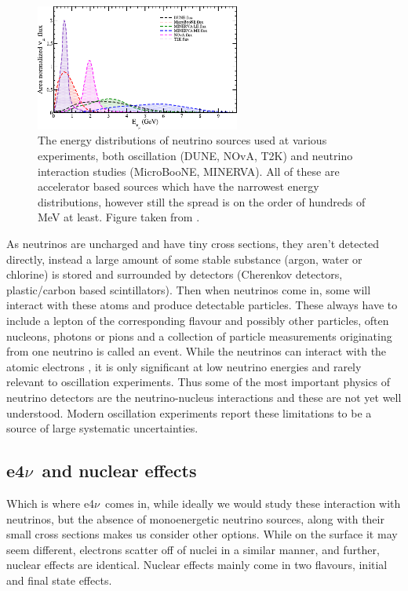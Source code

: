 \documentclass[a4paper,12pt]{article}
\newcommand{\efn}{e4$\nu$}
\begin{document}
\begin{figure}[H]
    \centering
    \includegraphics[width=0.6\textwidth]{figures/sourceEnergies.pdf}
    \caption{
        The energy distributions of neutrino sources used at various experiments, both oscillation (DUNE, NOvA, T2K) and neutrino interaction studies (MicroBooNE\cite{acciarriDesignConstructionMicroBooNE2017}, MINERVA\cite{mcfarlandMINERnADedicatedNeutrino2006}).
        All of these are accelerator based sources which have the narrowest energy distributions, however still the spread is on the order of hundreds of \si{MeV} at least.
        Figure taken from \cite{sajjadatharNeutrinosTheirInteractions2023}.
    }\label{fig:neu_s_Es}
\end{figure}

As neutrinos are uncharged and have tiny cross sections, they aren't detected directly, instead a large amount of some stable substance (argon, water or chlorine) is stored and surrounded by detectors (Cherenkov detectors, plastic/carbon based scintillators).
Then when neutrinos come in, some will interact with these atoms and produce detectable particles.
These always have to include a lepton of the corresponding flavour and possibly other particles, often nucleons, photons or pions and a collection of particle measurements originating from one neutrino is called an event.
While the neutrinos can interact with the atomic electrons \cite{whittinghamScatteringLowEnergy2022}, it is only significant at low neutrino energies and rarely relevant to oscillation experiments.
Thus some of the most important physics of neutrino detectors are the neutrino-nucleus interactions and these are not yet well understood.
Modern oscillation experiments report these limitations to be a source of large systematic uncertainties\cite{abeConstraintMatterAntimatter2020,novacollaborationNewConstraintsOscillation2018}.

\subsection{\efn\ and nuclear effects}
Which is where \efn\ comes in, while ideally we would study these interaction with neutrinos, but the absence of monoenergetic neutrino sources, along with their small cross sections makes us consider other options.
While on the surface it may seem different, electrons scatter off of nuclei in a similar manner, and further, nuclear effects are identical.
Nuclear effects mainly come in two flavours, initial and final state effects.
\end{document}
